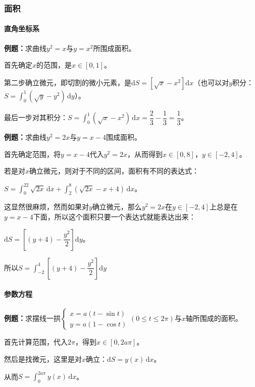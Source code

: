 \documentclass[UTF8, 12pt]{ctexart}
\begin{document}
\subsubsection{面积}

\paragraph{直角坐标系}  \leavevmode \medskip

\textbf{例题：}求曲线$y^2=x$与$y=x^2$所围成面积。

首先确定$x$的范围，是$x\in[0,1]$。

第二步确立微元，即切割的微小元素，是$\textrm{d}S=[\sqrt{x}-x^2]\textrm{d}x$（也可以对$y$积分：$S=\int_0^1(\sqrt{y}-y^2)\,\textrm{d}y$）。

最后一步对其积分：$S=\int_0^1(\sqrt{x}-x^2)\,\textrm{d}x=\dfrac{2}{3}-\dfrac{1}{3}=\dfrac{1}{3}$。

\textbf{例题：}求曲线$y^2=2x$与$y=x-4$围成面积。

首先确定范围，将$y=x-4$代入$y^2=2x$，从而得到$x\in[0,8]$，$y\in[-2,4]$。

若是对$x$确立微元，则对于不同的区间，面积有不同的表达式：

$S=\int_0^22\sqrt{2x}\,\textrm{d}x+\int_2^8(\sqrt{2x}-x+4)\,\textrm{d}x$。

这显然很麻烦，然而如果对$y$确立微元，那么$y^2=2x$在$y\in[-2,4]$上总是在$y=x-4$下面，所以这个面积只要一个表达式就能表达出来：

$\textrm{d}S=\left[(y+4)-\dfrac{y^2}{2}\right]\textrm{d}y$。

所以$S=\displaystyle{\int_{-2}^4\left[(y+4)-\dfrac{y^2}{2}\right]\textrm{d}y}$

\paragraph{参数方程}  \leavevmode \medskip

\textbf{例题：}求摆线一拱$\left\{\begin{array}{l}
    x=a(t-\sin t) \\
    y=a(1-\cos t)
\end{array}
\right.$$(0\leqslant t\leqslant 2\pi)$与$x$轴所围成的面积。\medskip

首先计算范围，代入$2\pi$，得到$x\in[0,2a\pi]$。

然后是找微元，这里是对$x$确立：$\textrm{d}S=y(x)\,\textrm{d}x$。

从而$S=\int_0^{2a\pi}y(x)\,\textrm{d}x$。
\end{document}
